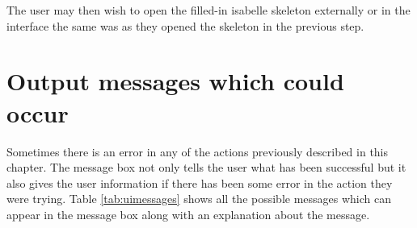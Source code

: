 The user may then wish to open the filled-in isabelle skeleton externally or in
the interface the same was as they opened the skeleton in the previous step.

\section{Output messages which could occur}

Sometimes there is an error in any of the actions previously described in this
chapter. The message box not only tells the user what has been successful but it
also gives the user information if there has been some error in the action they
were trying. Table \ref{tab:uimessages} shows all the possible messages which
can appear in the message box along with an explanation about the message.

